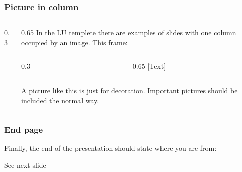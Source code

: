 \documentclass[aspectratio=1610]{beamer}
\begin{document}
\begin{frame}[fragile]
  \frametitle{Picture in column}
  \begin{columns}[onlytextwidth]
    \begin{column}{0.3\linewidth}
    \end{column}%
    \begin{column}{0.65\linewidth}
      In the LU templete there are examples of slides with one column occupied by an image. This frame:
\begin{CodeBox}{}
\begin{columns}[onlytextwidth]
  \begin{column}{0.3\textwidth}
  \end{column}
  \begin{column}{0.65\textwidth}
  	[Text]
  \end{column}
\end{columns}%
\end{CodeBox}      
      A picture like this is just for decoration. Important pictures should be included the normal way.
    \end{column}
  \end{columns}
\end{frame}

\begin{frame}
  \frametitle{End page}
  Finally, the end of the presentation should state where you are from:
\begin{CodeBox}{}
\begin{frame}[plain]
  \endpage
\end{frame}%
\end{CodeBox}
  See next slide
\end{frame}

\begin{frame}[plain]
  \endpage
\end{frame}

\end{document}
